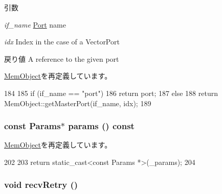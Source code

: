 \begin{DoxyParams}{引数}
\item[{\em if\_\-name}]\hyperlink{classPort}{Port} name \item[{\em idx}]Index in the case of a VectorPort\end{DoxyParams}
\begin{DoxyReturn}{戻り値}
A reference to the given port 
\end{DoxyReturn}


\hyperlink{classMemObject_adc4e675e51defbdd1e354dac729d0703}{MemObject}を再定義しています。


\begin{DoxyCode}
184 {
185     if (if_name == "port")
186         return port;
187     else
188         return MemObject::getMasterPort(if_name, idx);
189 }
\end{DoxyCode}
\hypertarget{classX86ISA_1_1Walker_acd3c3feb78ae7a8f88fe0f110a718dff}{
\subsubsection[{params}]{\setlength{\rightskip}{0pt plus 5cm}const {\bf Params}$\ast$ params () const}}
\label{classX86ISA_1_1Walker_acd3c3feb78ae7a8f88fe0f110a718dff}


\hyperlink{classMemObject_acd3c3feb78ae7a8f88fe0f110a718dff}{MemObject}を再定義しています。


\begin{DoxyCode}
202         {
203             return static_cast<const Params *>(_params);
204         }
\end{DoxyCode}
\hypertarget{classX86ISA_1_1Walker_a29cb5a4f98063ce6e9210eacbdb35298}{
\subsubsection[{recvRetry}]{\setlength{\rightskip}{0pt plus 5cm}void recvRetry ()}}
\label{classX86ISA_1_1Walker_a29cb5a4f98063ce6e9210eacbdb35298}



